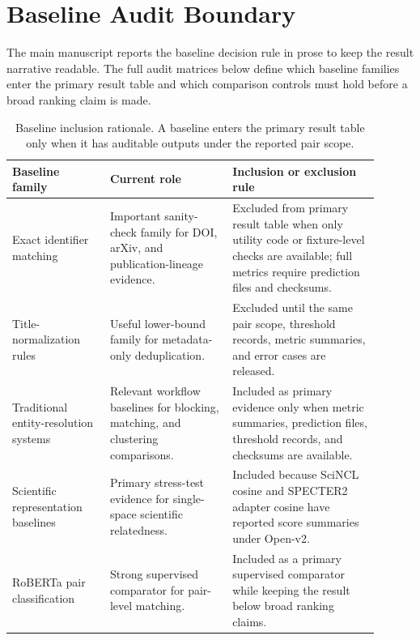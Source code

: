 \documentclass[11pt]{article}
\begin{document}
\section{Baseline Audit Boundary}

The main manuscript reports the baseline decision rule in prose to keep the result narrative readable. The full audit matrices below define which baseline families enter the primary result table and which comparison controls must hold before a broad ranking claim is made.

\begin{table}[H]
\caption{Baseline inclusion rationale. A baseline enters the primary result table only when it has auditable outputs under the reported pair scope.}
\label{tab:baseline-inclusion-rationale}
\centering
\footnotesize
\setlength{\tabcolsep}{3pt}
\begin{tabular}{L{0.24\linewidth}L{0.30\linewidth}L{0.36\linewidth}}
\toprule
Baseline family & Current role & Inclusion or exclusion rule \\
\midrule
Exact identifier matching & Important sanity-check family for DOI, arXiv, and publication-lineage evidence. & Excluded from primary result table when only utility code or fixture-level checks are available; full metrics require prediction files and checksums. \\
Title-normalization rules & Useful lower-bound family for metadata-only deduplication. & Excluded until the same pair scope, threshold records, metric summaries, and error cases are released. \\
Traditional entity-resolution systems & Relevant workflow baselines for blocking, matching, and clustering comparisons. & Included as primary evidence only when metric summaries, prediction files, threshold records, and checksums are available. \\
Scientific representation baselines & Primary stress-test evidence for single-space scientific relatedness. & Included because SciNCL cosine and SPECTER2 adapter cosine have reported score summaries under Open-v2. \\
RoBERTa pair classification & Strong supervised comparator for pair-level matching. & Included as a primary supervised comparator while keeping the result below broad ranking claims. \\
\bottomrule
\end{tabular}
\end{table}
\end{document}
